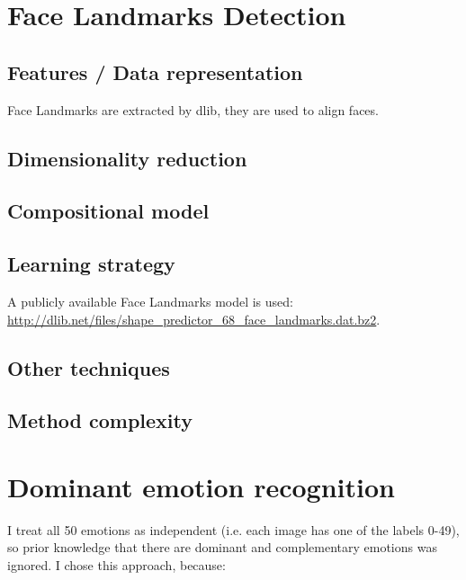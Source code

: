 \documentclass{article}
\begin{document}
\section{Face Landmarks Detection}
\subsection{Features / Data representation}

Face Landmarks are extracted by dlib, they are used to align faces.

\subsection{Dimensionality reduction}

\subsection{Compositional model}

\subsection{Learning strategy}

A publicly available Face Landmarks model is used: \url{http://dlib.net/files/shape_predictor_68_face_landmarks.dat.bz2}.

\subsection{Other techniques}

\subsection{Method complexity}


\section{Dominant emotion recognition}

I treat all 50 emotions as independent (i.e. each image has one of the labels 0-49), so prior knowledge that there are dominant and complementary emotions was ignored.
I chose this approach, because: 
\end{document}
